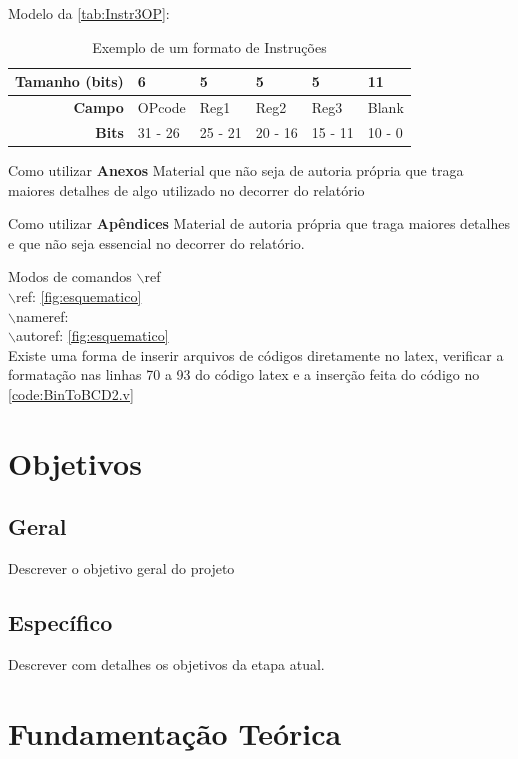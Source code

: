 \documentclass[
	12pt,				%
	openright,			%
	a4paper,			%
	english,			%
	french,				%
	spanish,			%
	brazil,				%
	]{abntex2}
\begin{document}
Modelo da \autoref{tab:Instr3OP}:
\begin{table}[htb]
\centering
\ABNTEXfontereduzida
\caption{Exemplo de um formato de Instruções} \label{tab:Instr3OP}
\begin{tabular}{r|p{2cm}|p{1.7cm}|p{1.7cm}|p{1.7cm}|p{3cm}} 
\textbf{Tamanho (bits)} & 6 & 5 & 5 & 5 & 11 \\ \hline
\textbf{Campo} & OPcode & Reg1 & Reg2 & Reg3 & Blank \\ \hline
\textbf{Bits} & 31 - 26 & 25 - 21 & 20 - 16 & 15 - 11 & 10 - 0\\
\end{tabular}
\end{table}

Como utilizar \textbf{Anexos}
Material que não seja de autoria própria que traga maiores detalhes de algo utilizado no decorrer do relatório

Como utilizar \textbf{Apêndices}
Material de autoria própria que traga maiores detalhes e que não seja essencial no decorrer do relatório.

Modos de comandos $\backslash$ref\\
$\backslash$ref: \ref{fig:esquematico}\\
$\backslash$nameref: \\
$\backslash$autoref: \autoref{fig:esquematico}\\

Existe uma forma de inserir arquivos de códigos diretamente no latex, verificar a formatação nas linhas 70 a 93 do código latex e a inserção feita do código  no \autoref{code:BinToBCD2.v} 

\chapter[Objetivos]{Objetivos}
\section{Geral}
Descrever o objetivo geral do projeto
\section{Específico}
Descrever com detalhes os objetivos da etapa atual.

\chapter{Fundamentação Teórica}
\end{document}
